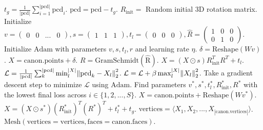 \begin{algorithm}[H]
\begin{algorithmic}[1]
    \State $t_g = \frac{1}{|\mathrm{pcd}|} \sum_{i=1}^{|\mathrm{pcd}|} \mathrm{pcd}_i$.
    \State $\mathrm{pcd} = \mathrm{pcd} - t_g$. \Comment{\textcolor{blue}{Center the point cloud.}}
        \State $R_{\mathrm{init}} =$ Random initial 3D rotation matrix.
        \State Initialize $v = \begin{pmatrix} 0 & 0 & ... & 0 \end{pmatrix}, s = \begin{pmatrix} 1 & 1 & 1 \end{pmatrix}, t_l = \begin{pmatrix} 0 & 0 & 0 \end{pmatrix}, \hat{R} = \begin{pmatrix} 1 & 0 & 0 \\ 0 & 1 & 0 \end{pmatrix}$.
        \State Initialize $\mathrm{Adam}$ \cite{kingma17adam} with parameters $v, s, t_l, r$ and learning rate $\eta$.
            \State $\delta = \mathrm{Reshape}(Wv)$.
            \State $X = \mathrm{canon.points} + \delta$. \Comment{\textcolor{blue}{Warped canonical point cloud.}}
            \State $R = \mathrm{GramSchmidt(\hat{R})}$.
            \State $X = (X \odot s) R_{\mathrm{init}}^T R^T + t_l$. \Comment{\textcolor{blue}{Scaled, rotated and translated point cloud.}}
            \State $\mathcal{L} = \frac{1}{|\mathrm{pcd}|} \sum_k^{|\mathrm{pcd}|} \min_l^{|X|} \norm{\mathrm{pcd}_k - X_l}_2^2$. \Comment{\textcolor{blue}{One-sided Chamfer distance.}}
            \State $\mathcal{L} = \mathcal{L} + \beta \max_l^{|X|} \norm{X_l}_2^2$. \Comment{\textcolor{blue}{Object size regularization.}}
            \State Take a gradient descent step to minimize $\mathcal{L}$ using $\mathrm{Adam}$.
        \EndFor
    \EndFor
    \State Find parameters $v^*, s^*, t^*_l, R_{\mathrm{init}}^*, R^*$ with the lowest final loss across $i \in \{ 1, 2, ..., S \}$.
    \State $X = \mathrm{canon.points} +\mathrm{Reshape}(W v^*)$.
    \State $X = (X \odot s^*) (R_{\mathrm{init}}^*)^T (R^*)^T + t^*_l + t_g$. \Comment{\textcolor{blue}{Complete point cloud in workspace coordinates.}}
    \State $\mathrm{vertices} = \langle X_1, X_2, ..., X_{|\mathrm{canon.vertices}|} \rangle$. 
    \State \Return $\mathrm{Mesh}(\mathrm{vertices} = \mathrm{vertices}, \mathrm{faces} = \mathrm{canon.faces})$. \Comment{\textcolor{blue}{Warped mesh.}}

\end{algorithmic}

\end{algorithm}